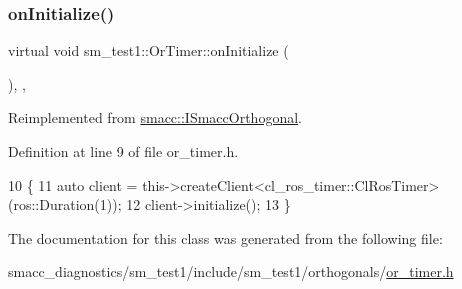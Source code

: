 \subsubsection{\texorpdfstring{on\+Initialize()}{onInitialize()}}
{\footnotesize\ttfamily virtual void sm\+\_\+test1\+::\+Or\+Timer\+::on\+Initialize (\begin{DoxyParamCaption}{ }\end{DoxyParamCaption})\hspace{0.3cm}{\ttfamily [inline]}, {\ttfamily [override]}, {\ttfamily [virtual]}}



Reimplemented from \hyperlink{classsmacc_1_1ISmaccOrthogonal_a6bb31c620cb64dd7b8417f8705c79c7a}{smacc\+::\+I\+Smacc\+Orthogonal}.



Definition at line 9 of file or\+\_\+timer.\+h.


\begin{DoxyCode}
10     \{
11         \textcolor{keyword}{auto} client = this->createClient<cl\_ros\_timer::ClRosTimer>(ros::Duration(1));
12         client->initialize();
13     \}
\end{DoxyCode}


The documentation for this class was generated from the following file\+:\begin{DoxyCompactItemize}
\item 
smacc\+\_\+diagnostics/sm\+\_\+test1/include/sm\+\_\+test1/orthogonals/\hyperlink{smacc__diagnostics_2sm__test1_2include_2sm__test1_2orthogonals_2or__timer_8h}{or\+\_\+timer.\+h}\end{DoxyCompactItemize}
